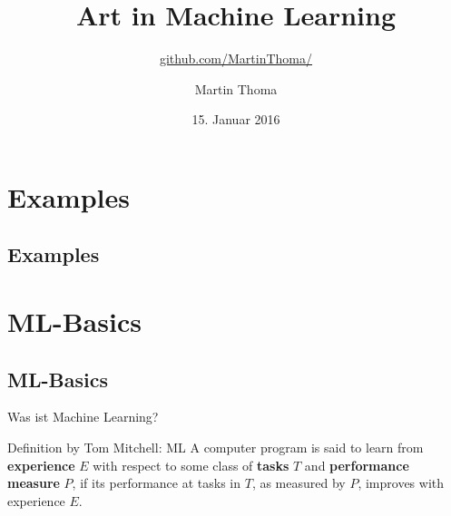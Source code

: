 \documentclass[hyperref={pdfpagelabels=false},usepdftitle=false]{beamer}
\newcommand {\framedgraphiconly}[1] {
    \setbeamertemplate{navigation symbols}{}
    \begin{frame}[plain]
        \begin{center}
            \texttt{[image: \#1]}
        \end{center}
    \end{frame}
}
\begin{document}
\title{Art in Machine Learning}
\subtitle{\href{https://github.com/MartinThoma/}{github.com/MartinThoma/}}
\author{Martin Thoma}
\date{15. Januar 2016}
\subject{Machine Learning}

\frame{\titlepage}

\section{Examples}
\subsection{Examples}


\section{ML-Basics}
\subsection{ML-Basics}

\begin{frame}{Was ist Machine Learning?}
    \begin{block}{Definition by Tom Mitchell: ML}
        A computer program is said to learn from \textbf{experience} $E$ with
        respect to some class of \textbf{tasks} $T$ and \textbf{performance
        measure} $P$, if its performance at tasks in $T$, as measured by $P$,
        improves with experience $E$.
    \end{block}
\end{frame}
\end{document}
